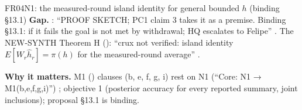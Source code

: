\begin{card}{FR04}{N1: the measured-round island identity for general bounded $h$ (binding §13.1)}
\textbf{Gap.} : ``PROOF SKETCH; PC1 claim 3 takes it as a premise. Binding §13.1: if it fails the goal is not met by withdrawal; HQ escalates to Felipe'' . The NEW-SYNTH Theorem H (): ``crux not verified: island identity $E[W_r\hat h_r]=\pi(h)$ for the measured-round average'' .

\textbf{Why it matters.} M1 () clauses (b, e, f, g, i) rest on N1 (``Core: N1 → M1(b,e,f,g,i)'') ; objective 1 (posterior accuracy for every reported summary, joint inclusions); proposal §13.1 is binding.


\end{card}
